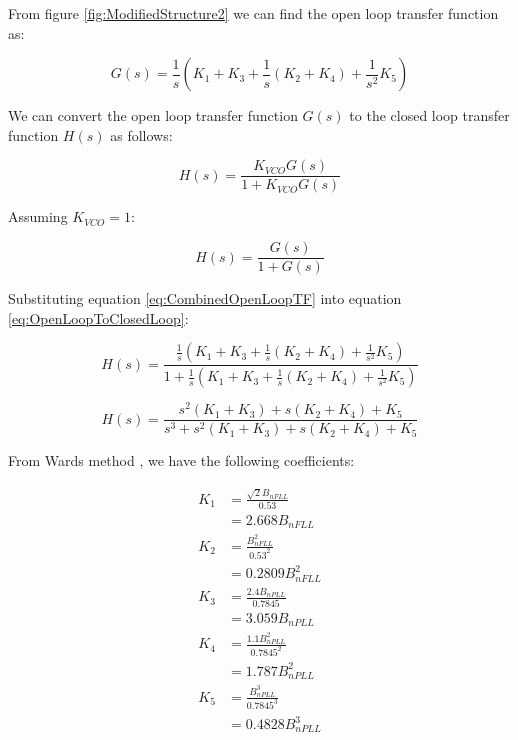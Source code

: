 



From figure \ref{fig:ModifiedStructure2} we can find the open loop transfer function as:

\begin{equation}
G(s) = \frac{1}{s} (K_1+K_3 + \frac{1}{s}(K_2+K_4) + \frac{1}{s^2} K_5)
\label{eq:CombinedOpenLoopTF}
\end{equation}

We can convert the open loop transfer function $G(s)$ to the closed loop transfer function $H(s)$ as follows\cite{KazemiPHD,Gardner}:

\begin{equation}
 H(s) = \frac{K_{VCO}G(s)}{1+K_{VCO}G(s)}
\end{equation}

Assuming $K_{VCO}=1$:

\begin{equation}
 H(s) = \frac{G(s)}{1+G(s)}
\label{eq:OpenLoopToClosedLoop}
\end{equation}

Substituting equation \ref{eq:CombinedOpenLoopTF} into equation \ref{eq:OpenLoopToClosedLoop}:

\begin{equation}
 H(s) = \frac{\frac{1}{s} (K_1+K_3 + \frac{1}{s}(K_2+K_4) + \frac{1}{s^2} K_5)}{1+\frac{1}{s} (K_1+K_3 + \frac{1}{s}(K_2+K_4) + \frac{1}{s^2} K_5)}
\end{equation}

\begin{equation}
 H(s) = \frac{s^2(K_1+K_3) + s(K_2+K_4) + K_5}
 {s^3+ s^2(K_1+K_3)+ s(K_2+K_4) + K_5}
\end{equation}
\clearpage


From Wards method \cite{Ward}, we have the following coefficients:

\begin{align*}
K_1 &=\frac{\sqrt{2}B_{nFLL}}{0.53}\\
    &= 2.668 B_{nFLL}\\
K_2 &=\frac{B_{nFLL}^2}{0.53^2}\\
    &= 0.2809 B_{nFLL}^2\\
K_3 &=\frac{2.4B_{nPLL}}{0.7845}\\ 
    &=3.059 B_{nPLL}\\
K_4 &=\frac{1.1B_{nPLL}^2}{0.7845^2}\\
    &=1.787 B_{nPLL}^2\\
K_5 &=\frac{B_{nPLL}^3}{0.7845^3}\\
    &=0.4828B_{nPLL}^3
\end{align*}

